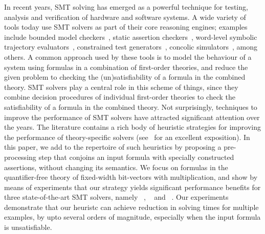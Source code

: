 %
In recent years, SMT solving has emerged as a powerful technique for
testing, analysis and verification of hardware and software systems.
A wide variety of tools today use SMT solvers as part of their core
reasoning engines; examples include bounded model
checkers~\cite{hwcbmc,boolector,ebmc,cbmc}, static assertion
checkers~\cite{corral,boogie}, word-level symbolic trajectory
evaluators~\cite{wste}, constrained test
generators~\cite{crv1,crv2,dart}, concolic simulators~\cite{concolic},
among others.  A common approach used by these tools is to model the
behaviour of a system using formulas in a combination of first-order
theories, and reduce the given problem to checking the
(un)satisfiability of a formula in the combined theory.  SMT solvers
play a central role in this scheme of things, since they combine
decision procedures of individual first-order theories to check the
satisfiability of a formula in the combined theory.  Not surprisingly,
techniques to improve the performance of SMT solvers have attracted
significant attention over the years.  The literature contains a rich
body of heuristic strategies for improving the performance of
theory-specific solvers (see~\cite{deMoura2013} for an excellent
exposition).  In this paper, we add to the repertoire of such
heuristics by proposing a pre-processing step that conjoins an input
formula with specially constructed assertions, without changing its
semantics. We focus on formulas in the quantifier-free theory of
fixed-width bit-vectors with multiplication, and show by means of
experiments that our strategy yields significant performance benefits
for three state-of-the-art SMT solvers, namely
{\zthree}~\cite{zthree}, {\cvcfour}~\cite{cvcfour} and
{\boolector}~\cite{boolector}.  Our experiments demonstrate that our
heuristc can achieve reduction in solving times for multiple examples,
by upto several orders of magnitude, especially when the input formula
is unsatisfiable.


